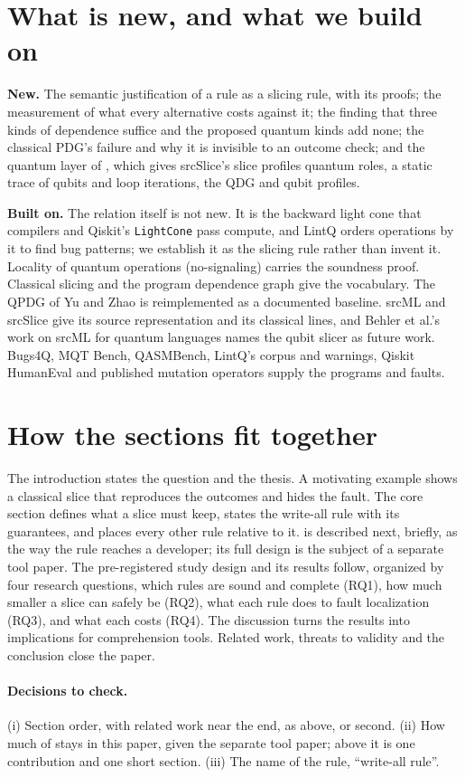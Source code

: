 \documentclass[10pt]{article}
\begin{document}
\section*{What is new, and what we build on}
\textbf{New.} The semantic justification of a rule as a slicing rule, with its proofs; the measurement of what
every alternative costs against it; the finding that three kinds of dependence suffice and the proposed
quantum kinds add none; the classical PDG's failure and why it is invisible to an outcome check; and the
quantum layer of \tool{}, which gives srcSlice's slice profiles quantum roles, a static trace of qubits and
loop iterations, the QDG and qubit profiles.

\textbf{Built on.} The relation itself is not new. It is the backward light cone that compilers and Qiskit's
\texttt{LightCone} pass compute, and LintQ orders operations by it to find bug patterns; we establish it as
the slicing rule rather than invent it. Locality of quantum operations (no-signaling) carries the soundness
proof. Classical slicing and the program dependence graph give the vocabulary. The QPDG of Yu and Zhao is
reimplemented as a documented baseline. srcML and srcSlice give \tool{} its source representation and its
classical lines, and Behler et al.'s work on srcML for quantum languages names the qubit slicer as future work.
Bugs4Q, MQT Bench, QASMBench, LintQ's corpus and warnings, Qiskit HumanEval and published mutation operators
supply the programs and faults.

\section*{How the sections fit together}
The introduction states the question and the thesis. A motivating example shows a classical slice that
reproduces the outcomes and hides the fault. The core section defines what a slice must keep, states the
write-all rule with its guarantees, and places every other rule relative to it. \tool{} is described next,
briefly, as the way the rule reaches a developer; its full design is the subject of a separate tool paper.
The pre-registered study design and its results follow, organized by four research questions, which rules
are sound and complete (RQ1), how much smaller a slice can safely be (RQ2), what each rule does to fault
localization (RQ3), and what each costs (RQ4). The discussion turns the results into implications for
comprehension tools. Related work, threats to validity and the conclusion close the paper.

\paragraph{Decisions to check.} (i) Section order, with related work near the end, as above, or second. (ii) How
much of \tool{} stays in this paper, given the separate tool paper; above it is one contribution and one short
section. (iii) The name of the rule, ``write-all rule''.
\end{document}
